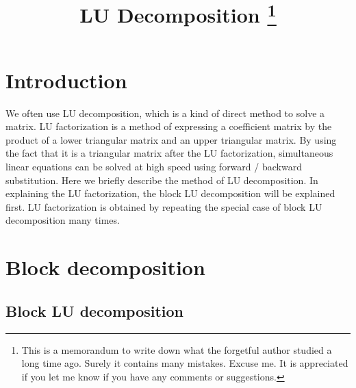 

\title{LU Decomposition \footnote{This is a memorandum to write down what the forgetful author studied a long time ago. Surely it contains many mistakes. Excuse me. It is appreciated if you let me know if you have any comments or suggestions. }}


\maketitle
\tableofcontents

\section{Introduction}

We often use LU decomposition, which is a kind of direct method to solve a matrix. LU factorization is a method of expressing a coefficient matrix by the product of a lower triangular matrix and an upper triangular matrix. By using the fact that it is a triangular matrix after the LU factorization, simultaneous linear equations can be solved at high speed using forward / backward substitution. Here we briefly describe the method of LU decomposition. In explaining the LU factorization, the block LU decomposition will be explained first. LU factorization is obtained by repeating the special case of block LU decomposition many times.

\section{Block decomposition}


\subsection{Block LU decomposition}

